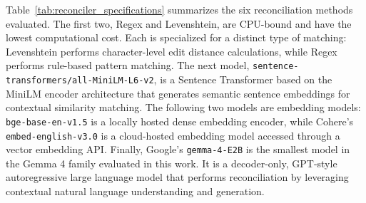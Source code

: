 \documentclass[journal]{IEEEtran}
\begin{document}
Table~\ref{tab:reconciler_specifications} summarizes the six reconciliation methods evaluated. The first two, Regex and Levenshtein, are CPU-bound and have the lowest computational cost. Each is specialized for a distinct type of matching: Levenshtein performs character-level edit distance calculations, while Regex performs rule-based pattern matching. The next model, \texttt{sentence-transformers/all-MiniLM-L6-v2}, is a Sentence Transformer based on the MiniLM encoder architecture that generates semantic sentence embeddings for contextual similarity matching. The following two models are embedding models: \texttt{bge-base-en-v1.5} is a locally hosted dense embedding encoder, while Cohere's \texttt{embed-english-v3.0} is a cloud-hosted embedding model accessed through a vector embedding API. Finally, Google's \texttt{gemma-4-E2B} is the smallest model in the Gemma 4 family evaluated in this work. It is a decoder-only, GPT-style autoregressive large language model that performs reconciliation by leveraging contextual natural language understanding and generation.

\vspace{1em}
\noindent
\begin{minipage}{\linewidth}
\centering
{}
\label{tab:reconciler_specifications}
\end{minipage}
\vspace{1em}
\end{document}
